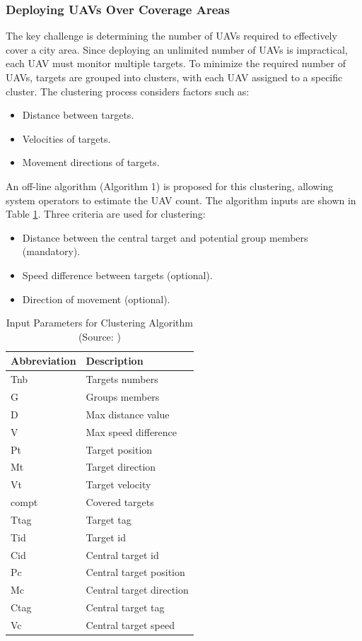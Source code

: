 \subsubsection{Deploying UAVs Over Coverage Areas}
The key challenge is determining the number of UAVs required to effectively cover a city area. Since deploying an unlimited number of UAVs is impractical, each UAV must monitor multiple targets. To minimize the required number of UAVs, targets are grouped into clusters, with each UAV assigned to a specific cluster. The clustering process considers factors such as:
\begin{itemize}
    \item Distance between targets.
    \item Velocities of targets.
    \item Movement directions of targets.
\end{itemize}

An off-line algorithm (Algorithm 1) is proposed for this clustering, allowing system operators to estimate the UAV count. The algorithm inputs are shown in Table \ref{tab:Parameters for Clustering Algorithm}. Three criteria are used for clustering:
\begin{itemize}
    \item Distance between the central target and potential group members (mandatory).
    \item Speed difference between targets (optional).
    \item Direction of movement (optional).
\end{itemize}

\begin{table}[H]
    \centering
    \begin{tabular}{|l|l|}
    \hline
    \textbf{Abbreviation} & \textbf{Description} \\ \hline
    Tnb & Targets numbers \\ \hline
    G & Groups members \\ \hline
    D & Max distance value \\ \hline
    V & Max speed difference \\ \hline
    Pt & Target position \\ \hline
    Mt & Target direction \\ \hline
    Vt & Target velocity \\ \hline
    compt & Covered targets \\ \hline
    Ttag & Target tag \\ \hline
    Tid & Target id \\ \hline
    Cid & Central target id \\ \hline
    Pc & Central target position \\ \hline
    Mc & Central target direction \\ \hline
    Ctag & Central target tag \\ \hline
    Vc & Central target speed \\ \hline
    \end{tabular}
    \caption{Input Parameters for Clustering Algorithm (Source: \cite{elloumi2018monitoring})}
    \label{tab:Parameters for Clustering Algorithm}
\end{table}


